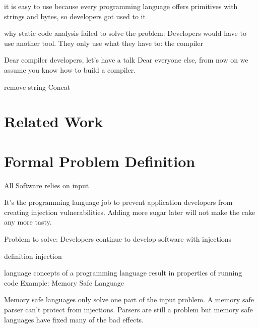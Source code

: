 \documentclass[conference]{IEEEtran}
\newcommand{\todo}[1] {\textcolor{red}{\textbf{TODO: #1}}}
\newcommand{\punchline}[1]{\textbf{Punch line: #1}}
\renewcommand{\punchline}[1]{}
\renewcommand{\todo}[1]{}
\begin{document}
\punchline{Why do developers use it}
it is easy to use because every programming language offers primitives with strings and bytes, so developers got used to it

\punchline{Related approaches}
why static code analysis failed to solve the problem: Developers would have to use another tool. They only use what they have to: the compiler

Dear compiler developers, let's have a talk
Dear everyone else, from now on we assume you know how to build a compiler.

\punchline{building SAST into compilers will not solve the problem}
\cite{rice}

\punchline{redesign the language}
remove string Concat

\punchline{the solution has to be as easy as string concatenation}

\punchline{summarize solution from both perspectives}



\section{Related Work}\label{sec:relwork}
\punchline{Lars bashing, how could you assume that developers will use your tool/library}
\todo{trusted types anschauen}

\section{Formal Problem Definition} \label{sec:problem}


All Software relies on input


It's the programming language job to prevent application developers from creating injection vulnerabilities.
Adding more sugar later will not make the cake any more tasty.


Problem to solve: Developers continue to develop software with injections

definition injection

language concepts of a programming language result in properties of running code
Example: Memory Safe Language

\punchline{memory safety is not the solution}

Memory safe languages only solve one part of the input problem. A memory safe parser can't protect from injections.
Parsers are still a problem but memory safe languages ​​have fixed many of the bad effects.
\end{document}
